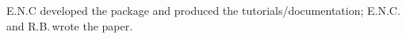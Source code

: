 \documentclass[codesnippet]{jss}
\begin{document}
E.N.C developed the  package and produced the tutorials/documentation; E.N.C.\,and R.B.\,wrote the paper.




\newpage
\end{document}
